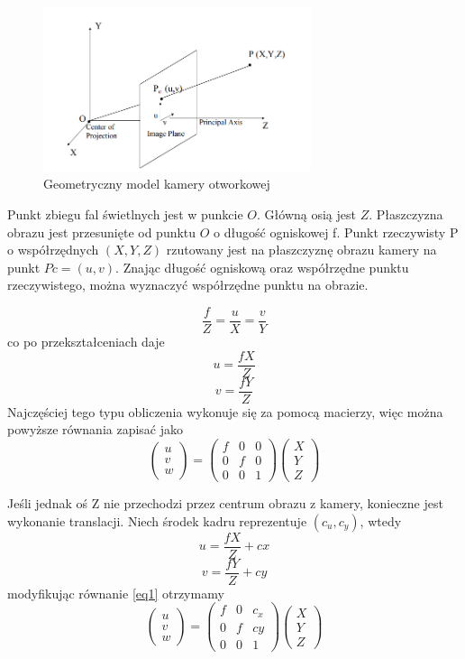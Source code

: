 \documentclass[12pt,twoside,polish]{article}
\begin{document}
\begin{figure}[h]
	\centering	
	\includegraphics[width=0.7\textwidth]{pinhole_model_img}
	\caption{Geometryczny model kamery otworkowej \cite{cameralib}}
	\label{pinhole_model}
\end{figure}

Punkt zbiegu fal świetlnych jest w punkcie $O$. Główną osią jest $Z$. Płaszczyzna obrazu jest przesunięte od punktu $O$ o długość ogniskowej f. Punkt rzeczywisty P o współrzędnych $(X,Y,Z)$ rzutowany jest na płaszczyznę obrazu kamery na punkt $Pc=(u,v)$. Znając długość ogniskową oraz współrzędne punktu rzeczywistego, można wyznaczyć współrzędne punktu na obrazie.

$$ \frac{f}{Z} = \frac{u}{X} = \frac{v}{Y} $$
co po przekształceniach daje
$$ u = \frac{fX}{Z}$$
$$ v = \frac{fY}{Z} $$
Najczęściej tego typu obliczenia wykonuje się za pomocą macierzy, więc można powyższe równania zapisać jako
\begin{equation}
	\label{eq1}
	\begin{pmatrix} u \\ v \\ w \end{pmatrix}
	=
	\begin{pmatrix} f & 0 & 0 \\ 0 & f & 0 \\ 0 & 0 & 1 \end{pmatrix}
	\begin{pmatrix} X \\ Y \\ Z \end{pmatrix}
\end{equation}

Jeśli jednak oś Z nie przechodzi przez centrum obrazu z kamery, konieczne jest wykonanie translacji. Niech środek kadru reprezentuje $(c_u, c_y)$, wtedy
$$u=\frac{fX}{Z} + cx$$
$$v=\frac{fY}{Z} + cy$$
modyfikując równanie \ref{eq1} otrzymamy
$$
\begin{pmatrix} u \\ v \\ w \end{pmatrix}
=
\begin{pmatrix} f & 0 & c_x \\ 0 & f & cy \\ 0 & 0 & 1\end{pmatrix}
\begin{pmatrix} X \\ Y \\ Z \end{pmatrix}
$$
\end{document}

